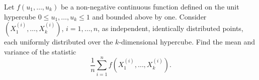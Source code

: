 Let $f(u_1, \ldots, u_k)$ be a non-negative continuous function defined on the unit hypercube $0 \leq u_1, \ldots, u_k \leq 1$ and bounded above by one. Consider $(X_1^{(i)}, \ldots, X_k^{(i)})$, $i = 1, \ldots, n$, as independent, identically distributed points, each uniformly distributed over the $k$-dimensional hypercube. Find the mean and variance of the statistic
$$\frac{1}{n} \sum_{i=1}^{n} f(X_1^{(i)}, \ldots, X_k^{(i)}).$$
